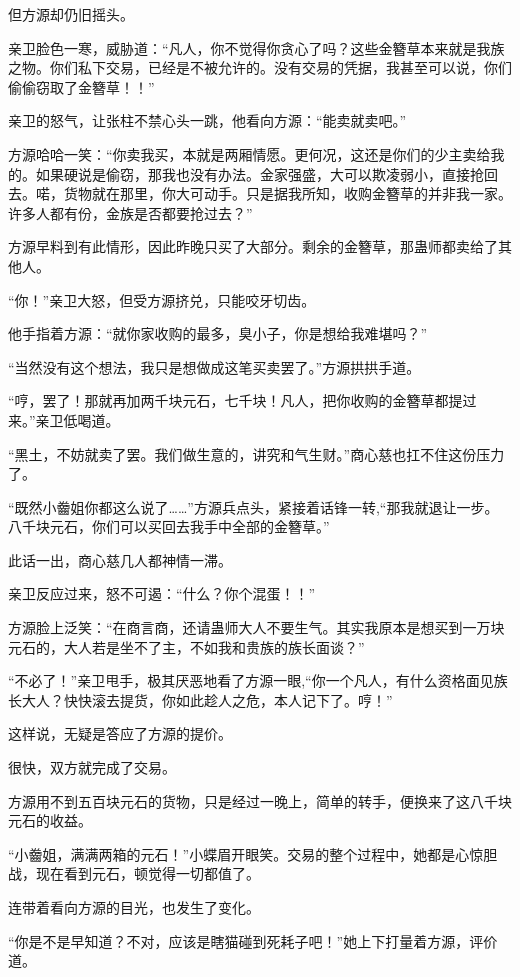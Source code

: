 \begin{this_body}
但方源却仍旧摇头。

亲卫脸色一寒，威胁道：“凡人，你不觉得你贪心了吗？这些金簪草本来就是我族之物。你们私下交易，已经是不被允许的。没有交易的凭据，我甚至可以说，你们偷偷窃取了金簪草！！”

亲卫的怒气，让张柱不禁心头一跳，他看向方源：“能卖就卖吧。”

方源哈哈一笑：“你卖我买，本就是两厢情愿。更何况，这还是你们的少主卖给我的。如果硬说是偷窃，那我也没有办法。金家强盛，大可以欺凌弱小，直接抢回去。喏，货物就在那里，你大可动手。只是据我所知，收购金簪草的并非我一家。许多人都有份，金族是否都要抢过去？”

方源早料到有此情形，因此昨晚只买了大部分。剩余的金簪草，那蛊师都卖给了其他人。

“你！”亲卫大怒，但受方源挤兑，只能咬牙切齿。

他手指着方源：“就你家收购的最多，臭小子，你是想给我难堪吗？”

“当然没有这个想法，我只是想做成这笔买卖罢了。”方源拱拱手道。

“哼，罢了！那就再加两千块元石，七千块！凡人，把你收购的金簪草都提过来。”亲卫低喝道。

“黑土，不妨就卖了罢。我们做生意的，讲究和气生财。”商心慈也扛不住这份压力了。

“既然小齤姐你都这么说了……”方源兵点头，紧接着话锋一转,“那我就退让一步。八千块元石，你们可以买回去我手中全部的金簪草。”

此话一出，商心慈几人都神情一滞。

亲卫反应过来，怒不可遏：“什么？你个混蛋！！”

方源脸上泛笑：“在商言商，还请蛊师大人不要生气。其实我原本是想买到一万块元石的，大人若是坐不了主，不如我和贵族的族长面谈？”

“不必了！”亲卫甩手，极其厌恶地看了方源一眼,“你一个凡人，有什么资格面见族长大人？快快滚去提货，你如此趁人之危，本人记下了。哼！”

这样说，无疑是答应了方源的提价。

很快，双方就完成了交易。

方源用不到五百块元石的货物，只是经过一晚上，简单的转手，便换来了这八千块元石的收益。

“小齤姐，满满两箱的元石！”小蝶眉开眼笑。交易的整个过程中，她都是心惊胆战，现在看到元石，顿觉得一切都值了。

连带着看向方源的目光，也发生了变化。

“你是不是早知道？不对，应该是瞎猫碰到死耗子吧！”她上下打量着方源，评价道。


\end{this_body}
